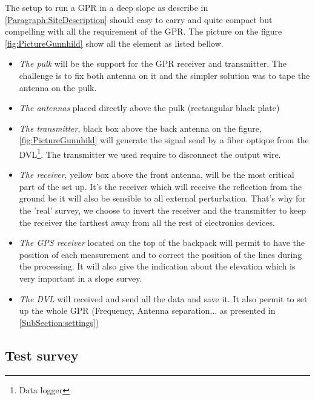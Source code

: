 The setup to run a GPR in a deep slope as describe in \ref{Paragraph:SiteDescription} should easy to carry and quite compact but compelling with all the requirement of the GPR. The picture on the figure \ref{fig:PictureGunnhild} show all the element as listed bellow.



\begin{itemize}
    \item \emph{The pulk} will be the support for the GPR receiver and transmitter. The challenge is to fix both antenna on it and the simpler solution was to tape the antenna on the pulk.
    \item \emph{The antennas} placed directly above the pulk (rectangular black plate)
    \item \emph{The transmitter}, black box above the back antenna on the figure, \ref{fig:PictureGunnhild} will generate the signal send by a fiber optique from the DVL\footnote{Data logger}. The transmitter we used require to disconnect the output wire.
    \item \emph{The receiver}, yellow box above the front antenna, will be the most critical part of the set up. It's the receiver which will receive the reflection from the ground be it will also be sensible to all external perturbation. That's why for the 'real' survey, we choose to invert the receiver and the transmitter to keep the receiver the farthest away from all the rest of electronics devices.
\end{itemize}

\begin{itemize}
    \item \emph{The GPS receiver} located on the top of the backpack will permit to have the position of each measurement and to correct the position of the lines during the processing. It will also give the indication about the elevation which is very important in a slope survey.
    \item \emph{The DVL} will received and send all the data and save it. It also permit to set up the whole GPR (Frequency, Antenna separation... as presented in \ref{SubSection:settings})
\end{itemize}



\subsection{Test survey} \label{Subsection:TestSurvey}


